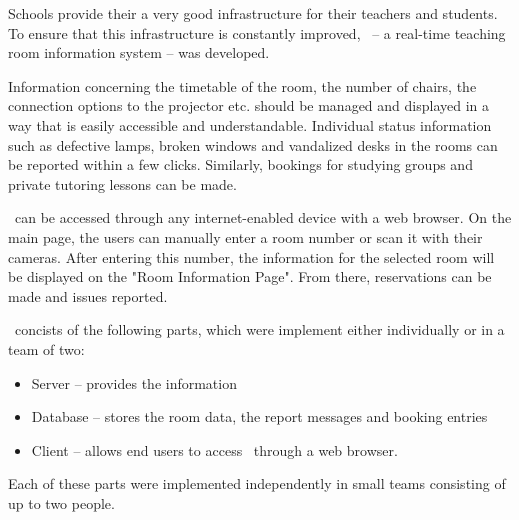     Schools provide their a very good infrastructure for their teachers and students. 
    To ensure that this infrastructure is constantly improved, \ZELIA\ -- a real-time teaching room information system -- was developed.
    
    Information concerning the timetable of the room, the number of chairs, the con\-nec\-tion options to the projector etc. should be managed and displayed in a way that is easily accessible and understandable.
    Individual status information such as defective lamps, broken windows and vandalized desks in the rooms can be reported within a few clicks.
    Similarly, bookings for studying groups and private tutoring lessons can be made.
    
    \ZELIA\ can be accessed through any internet-enabled device with a web browser. 
    On the main page, the users can manually enter a room number or scan it with their cameras. 
    After entering this number, the information for the selected room will be displayed on the "Room Information Page". 
    From there, reservations can be made and issues reported.
    
    \ZELIA\ concists of the following parts, which were implement either individually or in a team of two:
    \begin{itemize}
        \item Server -- provides the information
        \item Database -- stores the room data, the report messages and booking entries
        \item Client -- allows end users to access \ZELIA\ through a web browser.
    \end{itemize}
    
    Each of these parts were implemented independently in small teams consisting of up to two people.
